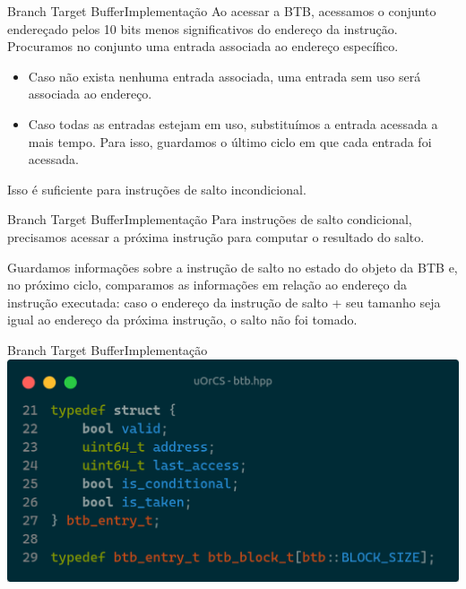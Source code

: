 \documentclass{beamer}
\begin{document}
\begin{frame}{Branch Target Buffer}{Implementação}
	Ao acessar a BTB, acessamos o conjunto endereçado pelos 10 bits menos
	significativos do endereço da instrução. Procuramos no conjunto uma entrada
	associada ao endereço específico.

	\vfill

	\begin{itemize}
		\item Caso não exista nenhuma entrada associada, uma entrada sem uso será
		      associada ao endereço.
		\item Caso todas as entradas estejam em uso, substituímos a entrada acessada
		      a mais tempo. Para isso, guardamos o último ciclo em que cada entrada
		      foi acessada.
	\end{itemize}

	\vfill

	Isso é suficiente para instruções de salto incondicional.
\end{frame}

\begin{frame}{Branch Target Buffer}{Implementação}
	Para instruções de salto condicional, precisamos acessar a próxima instrução
	para computar o resultado do salto.

	\vfill

	Guardamos informações sobre a instrução de salto no estado do objeto da BTB e,
	no próximo ciclo, comparamos as informações em relação ao endereço da
	instrução executada: caso o endereço da instrução de salto + seu tamanho seja
	igual ao endereço da próxima instrução, o salto não foi tomado.
\end{frame}

\begin{frame}{Branch Target Buffer}{Implementação}
	\includegraphics[width=\textwidth]{btb_entry.png}
\end{frame}
\end{document}
